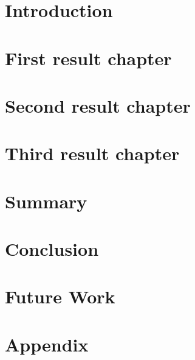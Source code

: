 \chapter{Introduction}



\myclearpage{}
\chapter{First result chapter}
\label{chap:reschap1}
 

\myclearpage{}
\chapter{Second result chapter}
\label{chap:reschap2}
 

\myclearpage{}
\chapter{Third result chapter}
\label{chap:reschap3}
 

\myclearpage{}
\chapter{Summary}
\label{chap:summary}


\myclearpage{}
\chapter{Conclusion}
\label{chap:conclusion}


\myclearpage{}
\chapter{Future Work}
\label{chap:future_work}


\myclearpage


\myclearpage{}
\appendix
\chapter{Appendix}


%
%

